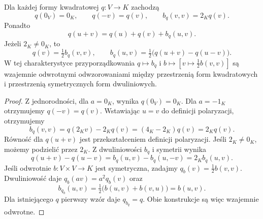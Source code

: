 \begin{stwierdzenie}
\label{prop:lin9-polaryzacja}
Dla każdej formy kwadratowej
\(q\colon V\to K\)
zachodzą
\[
 q(0_V)=0_K,\qquad
 q(-v)=q(v),\qquad
 b_q(v,v)=2_Kq(v).
\]
Ponadto
\[
 q(u+v)=q(u)+q(v)+b_q(u,v).
\]
Jeżeli \(2_K\ne0_K\), to
\[
 q(v)=\tfrac12 b_q(v,v),
 \qquad
 b_q(u,v)=\tfrac12
 \bigl(q(u+v)-q(u-v)\bigr).
\]
W tej charakterystyce
przyporządkowania
\(q\mapsto b_q\)
i \(b\mapsto[v\mapsto\tfrac12 b(v,v)]\)
są wzajemnie odwrotnymi
odwzorowaniami między
przestrzenią form kwadratowych
i przestrzenią symetrycznych
form dwuliniowych.
\end{stwierdzenie}
\begin{proof}
Z jednorodności, dla \(a=0_K\),
wynika \(q(0_V)=0_K\).
Dla \(a=-1_K\)
otrzymujemy \(q(-v)=q(v)\).
Wstawiając \(u=v\) do
definicji polaryzacji,
otrzymujemy
\[
 b_q(v,v)
 =q(2_Kv)-2_Kq(v)
 =(4_K-2_K)q(v)=2_Kq(v).
\]
Równość dla \(q(u+v)\)
jest przekształceniem
definicji polaryzacji.
Jeśli \(2_K\ne0_K\), możemy
podzielić przez \(2_K\).
Z dwuliniowości \(b_q\)
i symetrii wynika
\[
 q(u+v)-q(u-v)
 =b_q(u,v)-b_q(u,-v)
 =2_Kb_q(u,v).
\]
Jeśli odwrotnie
\(b\colon V\times V\to K\)
jest symetryczna, zadajmy
\(q_b(v)=\tfrac12 b(v,v)\).
Dwuliniowość daje
\(q_b(av)=a^2q_b(v)\)
oraz
\[
 b_{q_b}(u,v)
 =\tfrac12\bigl(
  b(u,v)+b(v,u)\bigr)=b(u,v).
\]
Dla istniejącego \(q\)
pierwszy wzór daje
\(q_{b_q}=q\).
Obie konstrukcje są więc
wzajemnie odwrotne.
\end{proof}

